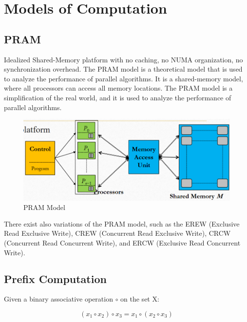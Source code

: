 \chapter{Models of Computation}

\section{PRAM}
\begin{paracol}{2}

   Idealized Shared-Memory platform with no caching, no NUMA organization, no synchronization overhead. The PRAM model is a theoretical model that is used to analyze the performance of parallel algorithms. It is a shared-memory model, where all processors can access all memory locations. The PRAM model is a simplification of the real world, and it is used to analyze the performance of parallel algorithms.
   \switchcolumn

   \begin{figure}[htbp]
      \centering
      \includegraphics{images/07/pram.png}
      \caption{PRAM Model}
      \label{fig:07/pram}
   \end{figure}
   
\end{paracol}

There exist also variations of the PRAM model, such as the EREW (Exclusive Read Exclusive Write), CREW (Concurrent Read Exclusive Write), CRCW (Concurrent Read Concurrent Write), and ERCW (Exclusive Read Concurrent Write).

\section{Prefix Computation}

Given a binary associative operation $\circ$ on the set X: 
\begin{definition}
   \begin{equation}
      (x_1 \circ x_2) \circ x_3 = x_1 \circ (x_2 \circ x_3)
   \end{equation}
\end{definition}

